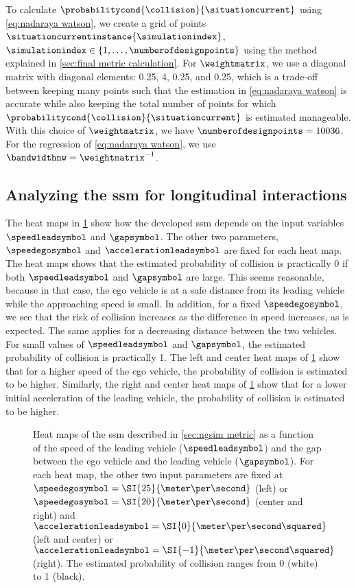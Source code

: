 To calculate $\probabilitycond{\collision}{\situationcurrent}$ using \cref{eq:nadaraya watson}, we create a grid of points $\situationcurrentinstance{\simulationindex}$, $\simulationindex\in\{1,\ldots,\numberofdesignpoints\}$ using the method explained in \cref{sec:final metric calculation}.
For $\weightmatrix$, we use a diagonal matrix with diagonal elements: 0.25, 4, 0.25, and 0.25, \cstartb which is a trade-off between keeping many points such that the estimation in \cref{eq:nadaraya watson} is accurate while also keeping the total number of points for which $\probabilitycond{\collision}{\situationcurrent}$ is estimated manageable.
With this choice of $\weightmatrix$, we have $\numberofdesignpoints=10036$. \cendb
For the regression of \cref{eq:nadaraya watson}, we use $\bandwidthnw=\weightmatrix^{-1}$.



\subsection{Analyzing the \acs{ssm} for longitudinal interactions}
\label{sec:analyzing ngsim metric}

The heat maps in \cref{fig:heatmaps} show how the developed \ac{ssm} depends on the input variables $\speedleadsymbol$ and $\gapsymbol$. 
The other two parameters, $\speedegosymbol$ and $\accelerationleadsymbol$ are fixed for each heat map.
The heat maps shows that the estimated probability of collision is practically 0 if both $\speedleadsymbol$ and $\gapsymbol$ are large.
This seems reasonable, because in that case, the ego vehicle is at a safe distance from its leading vehicle while the approaching speed is small. 
\cstartb In addition, for a fixed $\speedegosymbol$, we see that the risk of collision increases as the difference in speed increases, as is expected. \cendb
The same applies for a decreasing distance between the two vehicles.
For small values of $\speedleadsymbol$ and $\gapsymbol$, the estimated probability of collision is practically 1.
The left and center heat maps of \cref{fig:heatmaps} show that for a higher speed of the ego vehicle, the probability of collision is estimated to be higher.
Similarly, the right and center heat maps of \cref{fig:heatmaps} show that for a lower initial acceleration of the leading vehicle, the probability of collision is estimated to be higher.

\setlength{\figurewidth}{.35\linewidth}
\setlength{\figureheight}{0.8\figurewidth}
\begin{figure}
	\centering
	
	\caption{Heat maps of the \ac{ssm} described in \cref{sec:ngsim metric} as a function of the speed of the leading vehicle ($\speedleadsymbol$) and the gap between the ego vehicle and the leading vehicle ($\gapsymbol$).
		For each heat map, the other two input parameters are fixed at $\speedegosymbol=\SI{25}{\meter\per\second}$ (left) or $\speedegosymbol=\SI{20}{\meter\per\second}$ (center and right) and $\accelerationleadsymbol=\SI{0}{\meter\per\second\squared}$ (left and center) or $\accelerationleadsymbol=\SI{-1}{\meter\per\second\squared}$ (right).
		The estimated probability of collision ranges from 0 (white) to 1 (black).}
	\label{fig:heatmaps}
\end{figure}

